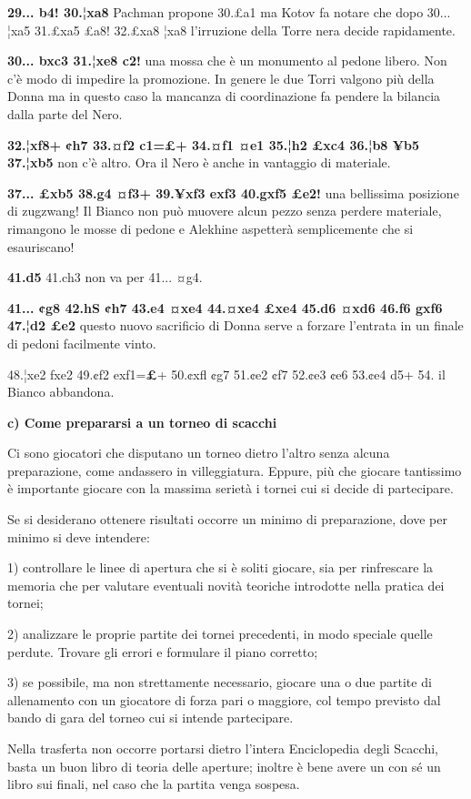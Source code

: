 \documentclass[
]{article}
\begin{document}
\textbf{29... b4! 30.¦xa8} Pachman propone 30.£a1 ma Kotov fa notare che
dopo 30... ¦xa5 31.£xa5 £a8! 32.£xa8 ¦xa8 l'irruzione della Torre nera
decide rapidamente.

\textbf{30... bxc3 31.¦xe8 c2!} una mossa che è un monumento al pedone
libero. Non c'è modo di impedire la promozione. In genere le due Torri
valgono più della Donna ma in questo caso la mancanza di coordinazione
fa pendere la bilancia dalla parte del Nero.

\textbf{32.¦xf8+ ¢h7 33.¤f2 c1=£+ 34.¤f1 ¤e1 35.¦h2 £xc4 36.¦b8 ¥b5
37.¦xb5} non c'è altro. Ora il Nero è anche in vantaggio di materiale.

\textbf{37... £xb5 38.g4 ¤f3+ 39.¥xf3 exf3 40.gxf5 £e2!} una bellissima
posizione di zugzwang! Il Bianco non può muovere alcun pezzo senza
perdere materiale, rimangono le mosse di pedone e Alekhine aspetterà
semplicemente che si esauriscano!

\textbf{41.d5} 41.ch3 non va per 41... ¤g4.

\textbf{41... ¢g8 42.hS ¢h7 43.e4 ¤xe4 44.¤xe4 £xe4 45.d6 ¤xd6 46.f6
gxf6 47.¦d2 £e2} questo nuovo sacrificio di Donna serve a forzare
l'entrata in un finale di pedoni facilmente vinto.

48.¦xe2 fxe2 49.¢f2 exf1=\textbf{£}+ 50.¢xfl ¢g7 51.¢e2 ¢f7 52.¢e3 ¢e6
53.¢e4 d5+ 54. il Bianco abbandona.

\textbf{c) Come prepararsi a un torneo di scacchi}

Ci sono giocatori che disputano un torneo dietro l'altro senza alcuna
preparazione, come andassero in villeggiatura. Eppure, più che giocare
tantissimo è importante giocare con la massima serietà i tornei cui si
decide di partecipare.

Se si desiderano ottenere risultati occorre un minimo di preparazione,
dove per minimo si deve intendere:

1) controllare le linee di apertura che si è soliti giocare, sia per
rinfrescare la memoria che per valutare eventuali novità teoriche
introdotte nella pratica dei tornei;

2) analizzare le proprie partite dei tornei precedenti, in modo speciale
quelle perdute. Trovare gli errori e formulare il piano corretto;

3) se possibile, ma non strettamente necessario, giocare una o due
partite di allenamento con un giocatore di forza pari o maggiore, col
tempo previsto dal bando di gara del torneo cui si intende partecipare.

Nella trasferta non occorre portarsi dietro l'intera Enciclopedia degli
Scacchi, basta un buon libro di teoria delle aperture; inoltre è bene
avere un con sé un libro sui finali, nel caso che la partita venga
sospesa.
\end{document}
